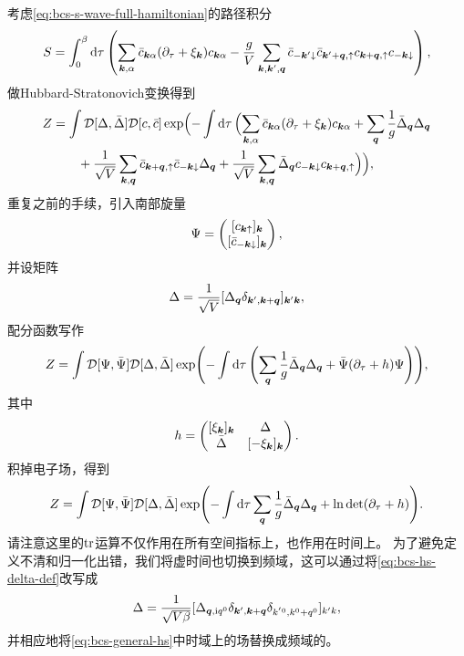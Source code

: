 考虑\eqref{eq:bcs-s-wave-full-hamiltonian}的路径积分
\begin{equation}
    S = \int_0^\beta \dd{\tau} \left( \sum_{\vb*{k}, \alpha} \bar{c}_{\vb*{k} \alpha} (\partial_\tau + \xi_{\vb*{k}}) c_{\vb*{k} \alpha} - \frac{g}{V} \sum_{\vb*{k}, \vb*{k}', \vb*{q}} \bar{c}_{-\vb*{k}' \downarrow} \bar{c}_{\vb*{k}' + \vb*{q}, \uparrow} c_{\vb*{k} + \vb*{q}, \uparrow} c_{- \vb*{k} \downarrow} \right),
\end{equation}
做Hubbard-Stratonovich变换得到
\begin{equation}
    \begin{aligned}
        Z &= \int \mathcal{D} [\Delta, \bar{\Delta}] \mathcal{D} [c, \bar{c}] \exp\Bigl( - \int \dd{\tau} \Bigl( \sum_{\vb*{k}, \alpha} \bar{c}_{\vb*{k} \alpha} (\partial_\tau + \xi_{\vb*{k}}) c_{\vb*{k} \alpha} + \sum_{\vb*{q}} \frac{1}{g} \bar{\Delta}_{\vb*{q}} \Delta_{\vb*{q}} \\
        &\quad \quad + \frac{1}{\sqrt{V}} \sum_{\vb*{k}, \vb*{q}} \bar{c}_{\vb*{k} + \vb*{q}, \uparrow} \bar{c}_{-\vb*{k} \downarrow} \Delta_{\vb*{q}} + \frac{1}{\sqrt{V}} \sum_{\vb*{k}, \vb*{q}} \bar{\Delta}_{\vb*{q}} c_{- \vb*{k} \downarrow} c_{\vb*{k} + \vb*{q}, \uparrow} \Bigr) \Bigr),
    \end{aligned}
    \label{eq:bcs-general-hs}
\end{equation}
重复之前的手续，引入南部旋量
\begin{equation}
    \Psi = \pmqty{ [c_{\vb*{k} \uparrow}]_{\vb*{k}} \\ [\bar{c}_{-\vb*{k} \downarrow}]_{\vb*{k}} },
\end{equation}
并设矩阵
\begin{equation}
    \Delta = \frac{1}{\sqrt{V}} [\Delta_{\vb*{q}} \delta_{\vb*{k}', \vb*{k}+\vb*{q}}]_{\vb*{k}' \vb*{k}},
    \label{eq:bcs-hs-delta-def}
\end{equation}
配分函数写作
\[
    Z = \int \mathcal{D} [\Psi, \bar{\Psi}] \mathcal{D} [\Delta, \bar{\Delta}] \exp(- \int \dd{\tau} \left( \sum_{\vb*{q}} \frac{1}{g} \bar{\Delta}_{\vb*{q}} \Delta_{\vb*{q}} + \bar{\Psi} (\partial_\tau + h) \Psi \right) ),
\]
其中
\begin{equation}
    h = \pmqty{[\xi_{\vb*{k}}]_{\vb*{k}} & \Delta \\ \bar{\Delta} & [- \xi_{\vb*{k}}]_{\vb*{k}}}.
\end{equation}
积掉电子场，得到
\begin{equation}
    Z = \int \mathcal{D} [\Psi, \bar{\Psi}] \mathcal{D} [\Delta, \bar{\Delta}] \exp(- \int \dd{\tau} \sum_{\vb*{q}} \frac{1}{g} \bar{\Delta}_{\vb*{q}} \Delta_{\vb*{q}} + \ln \det (\partial_\tau + h) ).
\end{equation}
请注意这里的$\trace$运算不仅作用在所有空间指标上，也作用在时间上。
为了避免定义不清和归一化出错，我们将虚时间也切换到频域，这可以通过将\eqref{eq:bcs-hs-delta-def}改写成
\begin{equation}
    \Delta = \frac{1}{\sqrt{V \beta}} [\Delta_{\vb*{q}, \mathrm{i} q^0} \delta_{\vb*{k}', \vb*{k} + \vb*{q}} \delta_{k^{'0}, k^0 + q^0}]_{k' k},
    \label{eq:bcs-hs-fully-freq-delta}
\end{equation}
并相应地将\eqref{eq:bcs-general-hs}中时域上的场替换成频域的。

